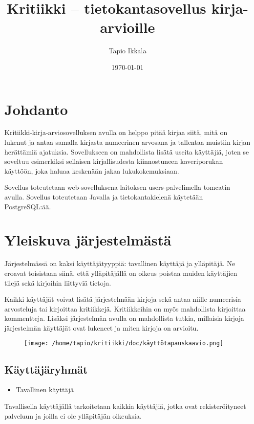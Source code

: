 \documentclass[11pt,oneside,article]{memoir}
\title{Kritiikki – tietokantasovellus kirja-arvioille}
\author{Tapio Ikkala}
\date{\today}
\begin{document}
\maketitle

\section{Johdanto}
\label{sec-1}

Kritiikki-kirja-arviosovelluksen avulla on helppo pitää kirjaa siitä, mitä on lukenut ja antaa samalla kirjasta numeerinen arvosana ja tallentaa muistiin kirjan herättämiä ajatuksia. Sovellukseen on mahdollista lisätä useita käyttäjiä, joten se soveltuu esimerkiksi sellaisen kirjallisudesta kiinnostuneen kaveriporukan käyttöön, joka haluaa keskenään jakaa lukukokemuksiaan. 

Sovellus toteutetaan web-sovelluksena laitoksen users-palvelimella tomcatin avulla. Sovellus toteutetaan Javalla ja tietokantakielenä käytetään PostgreSQL:ää.
\section{Yleiskuva järjestelmästä}
\label{sec-2}

Järjestelmässä on kaksi käyttäjätyyppiä: tavallinen käyttäjä ja ylläpitäjä. Ne eroavat toisistaan siinä, että ylläpitäjällä on oikeus poistaa muiden käyttäjien tilejä sekä kirjoihin liittyviä tietoja. 

Kaikki käyttäjät voivat lisätä järjestelmään kirjoja sekä antaa niille numeerisia arvosteluja tai kirjoittaa kritiikkejä. Kritiikkeihin on myös mahdollista kirjoittaa kommentteja. Lisäksi järjestelmän avulla on mahdollista tutkia, millaisia kirjoja järjestelmän käyttäjät ovat lukeneet ja miten kirjoja on arvioitu.

\begin{figure}[h]
\begin{center}
\texttt{[image: /home/tapio/kritiikki/doc/käyttötapauskaavio.png]}
\end{center}
\end{figure}
\subsection{Käyttäjäryhmät}
\label{sec-2-1}

\begin{itemize}
\item Tavallinen käyttäjä
\end{itemize}
Tavallisella käyttäjällä tarkoitetaan kaikkia käyttäjiä, jotka ovat rekisteröityneet palveluun ja joilla ei ole ylläpitäjän oikeuksia.
\end{document}
